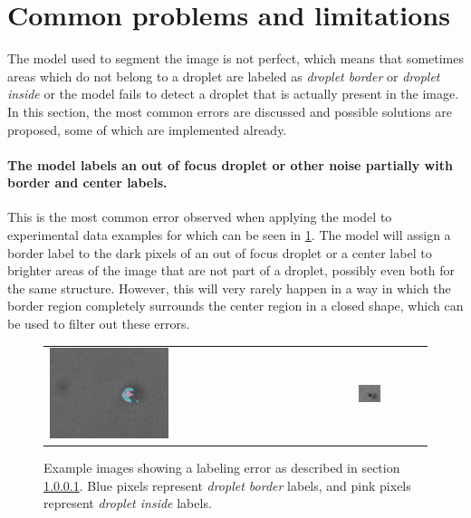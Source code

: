 \section{Common problems and limitations}
\label{sec:limitations}

The model used to segment the image is not perfect, which means that sometimes areas which do not belong to a droplet are labeled as \emph{droplet border} or \emph{droplet inside} or the model fails to detect a droplet that is actually present in the image.
In this section, the most common errors are discussed and possible solutions are proposed, some of which are implemented already.

\paragraph{The model labels an out of focus droplet or other noise partially with border and center labels.}
\label{sec:partially_wrong}
This is the most common error observed when applying the model to experimental data examples for which can be seen in \ref{fig:partially_wrong}.
The model will assign a border label to the dark pixels of an out of focus droplet or a center label to brighter areas of the image that are not part of a droplet, possibly even both for the same structure.
However, this will very rarely happen in a way in which the border region completely surrounds the center region in a closed shape, which can be used to filter out these errors.

\begin{figure}[htbp]
    \centering
    \begin{tabular}{ll}
        \includegraphics[width=0.4\textwidth]{images/bad1.png}
        &
        \includegraphics[width=0.35\textwidth]{images/bad2.png}
    \end{tabular}
    \caption{Example images showing a labeling error as described in section \ref{sec:partially_wrong}. Blue pixels represent \emph{droplet border} labels, and pink pixels represent \emph{droplet inside} labels.}
    \label{fig:partially_wrong}
\end{figure}


